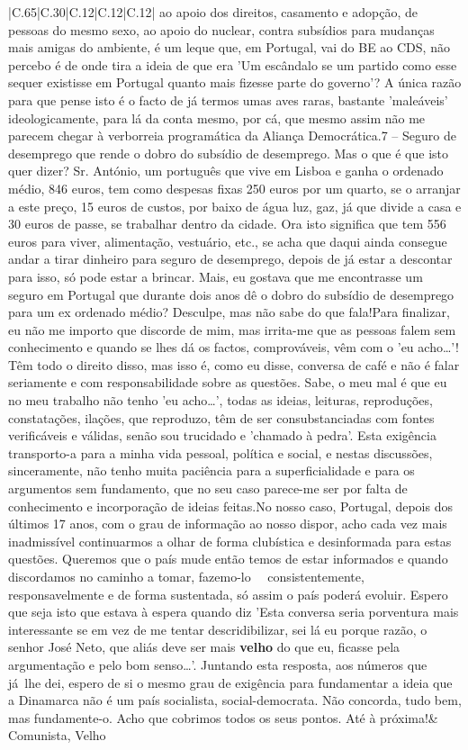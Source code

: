 \documentclass[11pt]{article}
\newlength\mylength
\begin{document}
\begin{center}
\begin{longtable}{|C{.65\mylength}|C{.30\mylength}|C{.12\mylength}|C{.12\mylength}|C{.12\mylength}|}
ao apoio dos direitos, casamento e adopção, de pessoas do mesmo sexo, ao apoio do nuclear, contra subsídios para mudanças mais amigas do ambiente, é um leque que, em Portugal, vai do BE ao CDS, não percebo é de onde tira a ideia de que era 'Um escândalo se um partido como esse sequer existisse em Portugal quanto mais fizesse parte do governo'? A única razão para que pense isto é o facto de já termos umas aves raras, bastante 'maleáveis' ideologicamente, para lá da conta mesmo, por cá, que mesmo assim não me parecem chegar à verborreia programática da Aliança Democrática.7 – Seguro de desemprego que rende o dobro do subsídio de desemprego. Mas o que é que isto quer dizer? Sr. António, um português que vive em Lisboa e ganha o ordenado médio, 846 euros, tem como despesas fixas 250 euros por um quarto, se o arranjar a este preço, 15 euros de custos, por baixo de água luz, gaz, já que divide a casa e 30 euros de passe, se trabalhar dentro da cidade. Ora isto significa que tem 556 euros para viver, alimentação, vestuário, etc., se acha que daqui ainda consegue andar a tirar dinheiro para seguro de desemprego, depois de já estar a descontar para isso, só pode estar a brincar. Mais, eu gostava que me encontrasse um seguro em Portugal que durante dois anos dê o dobro do subsídio de desemprego para um ex ordenado médio? Desculpe, mas não sabe do que fala!Para finalizar, eu não me importo que discorde de mim, mas irrita-me que as pessoas falem sem conhecimento e quando se lhes dá os factos, comprováveis, vêm com o 'eu acho…'! Têm todo o direito disso, mas isso é, como eu disse, conversa de café e não é falar seriamente e com responsabilidade sobre as questões. Sabe, o meu mal é que eu no meu trabalho não tenho 'eu acho…', todas as ideias, leituras, reproduções, constatações, ilações, que reproduzo, têm de ser consubstanciadas com fontes verificáveis e válidas, senão sou trucidado e 'chamado à pedra'. Esta exigência transporto-a para a minha vida pessoal, política e social, e nestas discussões,  sinceramente, não tenho muita paciência para a superficialidade e para os argumentos sem fundamento, que no seu caso parece-me ser por falta de conhecimento e incorporação de ideias feitas.No nosso caso, Portugal, depois dos últimos 17 anos, com o grau de informação ao nosso dispor, acho cada vez mais inadmissível continuarmos a olhar de forma clubística e desinformada para estas questões. Queremos que o país mude então temos de estar informados e quando discordamos no caminho a tomar, fazemo-lo   consistentemente, responsavelmente e de forma sustentada, só assim o país poderá evoluir. Espero que seja isto que estava à espera quando diz 'Esta conversa seria porventura mais interessante se em vez de me tentar descridibilizar, sei lá eu porque razão, o senhor José Neto, que aliás deve ser mais \textbf{velho} do que eu, ficasse pela argumentação e pelo bom senso…'. Juntando esta resposta, aos números que já lhe dei, espero de si o mesmo grau de exigência para fundamentar a ideia que a Dinamarca não é um país socialista, social-democrata. Não concorda, tudo bem, mas fundamente-o. Acho que cobrimos todos os seus pontos. Até à próxima!\normalsize   & Comunista, Velho 
\end{longtable}
\end{center}
\end{document}
